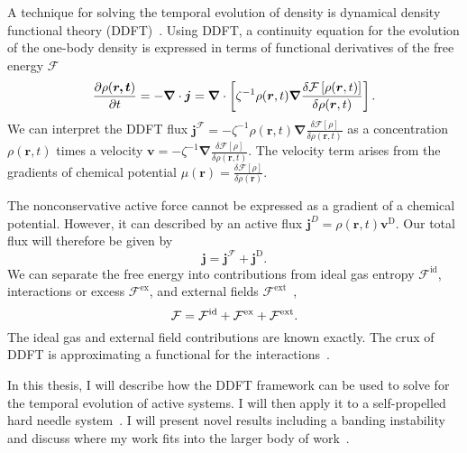 A technique for solving the temporal evolution of density is dynamical density
functional theory (DDFT)~\cite{marconi_dynamic_99, marconi_dynamic_00,
  archer_dynamical_04, archer_dynamical_05}.  Using DDFT, a continuity equation
for the evolution of the one-body density is expressed in terms of functional
derivatives  of the free energy $\mathcal{F}$
%
\begin{align}
  \label{eqn:ddft_intro}
  \frac{\partial\rho(\bm{r,t})}{\partial t} = 
  -\bm{\nabla} \cdot \bm{j} =
  \bm{\nabla}  \cdot \left[ \zeta^{-1} \rho(\bm{r},t) \bm{\nabla}
    \frac{\delta \mathcal{F} \left[ \rho(\bm{r}, t ) \right]}
  {\delta \rho(\bm{r}, t ) } \right].
\end{align}
%
We can interpret the DDFT flux $\bm{j}^{\mathcal{F}} = - \zeta^{-1} \rho(\bm{r},
t) \bm{\nabla} \frac{ \delta \mathcal{F} \left[ \rho \right]}{\delta \rho
  (\bm{r}, t) }$ as a concentration $ \rho(\bm{r},t ) $ times a velocity $
\bm{v} = - \zeta^{-1} \bm{\nabla} \frac{ \delta \mathcal{F} \left[ \rho \right]
} {\delta \rho (\bm{r}, t ) } $. The velocity term arises from the gradients of
chemical potential $ \mu( \bm{r} ) = \frac{ \delta\mathcal{F} \left[ \rho
  \right] } {\delta \rho (\bm{r} )} $.

The nonconservative active force cannot be expressed as a gradient of a chemical
potential.  However, it can described by an active flux $ \bm{j}^{D} =
\rho(\bm{r},t)\bm{v}^{\text{D}} $.  Our total flux will therefore be given by
%
\begin{equation}
  \bm{j} = \bm{j}^{\mathcal{F}} + \bm{j}^{\text{D}}.
\end{equation}
%
We can separate the free energy into contributions from ideal gas entropy
$\mathcal{F}^{\text{id}}$, interactions or excess $\mathcal{F}^{\text{ex}}$, and
external fields $\mathcal{F}^{\text{ext}}$~\cite{hansen_theory_06}, 
%
\begin{equation}
  \mathcal{F} = \mathcal{F}^{\mathrm{id}} + \mathcal{F}^{\mathrm{ex}} 
  +\mathcal{F}^{\mathrm{ext}}.
\end{equation}
%
The ideal gas and external field contributions are known exactly. The crux of
DDFT is approximating a functional for the
interactions~\cite{archer_dynamical_05}.

In this thesis, I will describe how the DDFT framework can be used to solve for
the temporal evolution of active systems. I will then apply it to a
self-propelled hard needle
system~\cite{baskaran_hydrodynamics_08,baskaran_enhanced_08,
  wensink_aggregation_08, baskaran_selfregulation_12, ginelli_largescale_10,
  kuan_hysteresis_15}. I will present novel results including a banding
instability and discuss where my work fits into the larger body of
work~\cite{stefferson_selforganized_18}.
